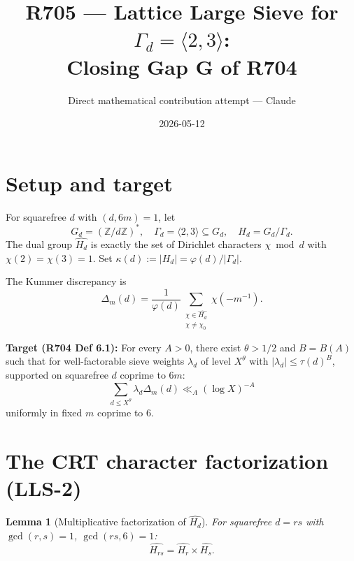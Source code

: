 \documentclass[11pt]{article}
\title{R705 --- Lattice Large Sieve for $\Gamma_d = \langle 2, 3\rangle$:\\
Closing Gap G of R704}
\author{Direct mathematical contribution attempt --- Claude}
\date{2026-05-12}
\newtheorem{lemma}[theorem]{Lemma}
\newcommand{\Z}{\mathbb Z}
\begin{document}
\maketitle

\begin{center}
\end{center}

\section{Setup and target}

For squarefree $d$ with $(d, 6m) = 1$, let
\[
G_d = (\Z/d\Z)^*, \quad \Gamma_d = \langle 2, 3 \rangle \subseteq G_d, \quad H_d = G_d/\Gamma_d.
\]
The dual group $\widehat{H_d}$ is exactly the set of Dirichlet characters $\chi \bmod d$ with $\chi(2) = \chi(3) = 1$. Set $\kappa(d) := |H_d| = \varphi(d)/|\Gamma_d|$.

The Kummer discrepancy is
\[
\Delta_m(d) = \frac{1}{\varphi(d)} \sum_{\substack{\chi \in \widehat{H_d} \\ \chi \neq \chi_0}} \chi(-m^{-1}).
\]

\textbf{Target (R704 Def 6.1):} For every $A > 0$, there exist $\theta > 1/2$ and $B = B(A)$ such that for well-factorable sieve weights $\lambda_d$ of level $X^\theta$ with $|\lambda_d| \leq \tau(d)^B$, supported on squarefree $d$ coprime to $6m$:
\begin{equation}\label{eq:LLS}
\sum_{d \leq X^\theta} \lambda_d \Delta_m(d) \ll_A (\log X)^{-A}
\end{equation}
uniformly in fixed $m$ coprime to 6.

\section{The CRT character factorization (LLS-2)}

\begin{lemma}[Multiplicative factorization of $\widehat{H_d}$]\label{lem:character-CRT}
For squarefree $d = rs$ with $\gcd(r, s) = 1$, $\gcd(rs, 6) = 1$:
\[
\widehat{H_{rs}} = \widehat{H_r} \times \widehat{H_s}.
\]
\end{lemma}
\end{document}
